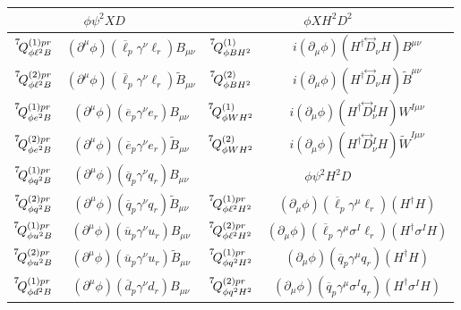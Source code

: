 \begin{table}[htbp]
\centering
\setlength{\tabcolsep}{1pt}
\renewcommand{\arraystretch}{1.5}
\begin{tabular}{ c|c||c|c }
\toprule
\multicolumn{2}{c||}{\cellcolor{hdrcolor}\hyperref[par:phipsi2XD]{\boldmath$\phi \psi^2 X D$}} & \multicolumn{2}{c}{\cellcolor{hdrcolor}\hyperref[par:phiXH2D2]{\boldmath$\phi X H^2 D^2$}} \\
\hline
$\op{7}{\phi \ell^2 B}{(1)pr}$ & $(\partial^\mu \phi)(\overline \ell_p \gamma^\nu \ell_r)B_{\mu\nu}$ & $\op{7}{\phi B H^2}{(1)}$ & $i(\partial_\mu \phi)(H^\dagger \overset{\leftrightarrow}{D}{}_\nu H)B^{\mu\nu}$
\\
$\op{7}{\phi \ell^2 B}{(2)pr}$ & $(\partial^\mu \phi)(\overline \ell_p \gamma^\nu \ell_r)\widetilde B_{\mu\nu}$  & $\op{7}{\phi B H^2}{(2)}$ & $i(\partial_\mu \phi)(H^\dagger \overset{\leftrightarrow}{D}{}_\nu H) \widetilde B^{\mu\nu}$
\\
$\op{7}{\phi e^2 B}{(1)pr}$ & $(\partial^\mu \phi)(\overline e_p \gamma^\nu e_r)B_{\mu\nu}$ & $\op{7}{\phi W H^2}{(1)}$ & $i(\partial_\mu \phi)(H^\dagger \overset{\leftrightarrow}{D}{}_\nu^I H)W^{I\mu\nu}$
\\
$\op{7}{\phi e^2 B}{(2)pr}$ & $(\partial^\mu \phi)(\overline e_p \gamma^\nu e_r)\widetilde B_{\mu\nu}$  & $\op{7}{\phi W H^2}{(2)}$ & $i(\partial_\mu \phi)(H^\dagger \overset{\leftrightarrow}{D}{}^I_\nu H) \widetilde W^{I\mu\nu}$
\\ \hhline{~|~||--}
$\op{7}{\phi q^2 B}{(1)pr}$ & $(\partial^\mu \phi)(\overline q_p \gamma^\nu q_r)B_{\mu\nu}$ & \multicolumn{2}{c}{\cellcolor{hdrcolor}\hyperref[par:phipsi2H2D]{\boldmath$\phi \psi^2 H^2 D$}} 
\\ \hhline{~|~||--}
$\op{7}{\phi q^2 B}{(2)pr}$ & $(\partial^\mu \phi)(\overline q_p \gamma^\nu q_r)\widetilde B_{\mu\nu}$   & $\op{7}{\phi \ell^2 H^2}{(1)pr}$ & $(\partial_\mu \phi)(\overline \ell_p \gamma^\mu \ell_r)(H^\dagger H)$ 
\\
$\op{7}{\phi u^2 B}{(1)pr}$ & $(\partial^\mu \phi)(\overline u_p \gamma^\nu u_r)B_{\mu\nu}$  & $\op{7}{\phi \ell^2 H^2}{(2)pr}$ & $(\partial_\mu \phi)(\overline \ell_p \gamma^\mu \sigma^I \ell_r)(H^\dagger \sigma^I H)$
\\
$\op{7}{\phi u^2 B}{(2)pr}$ & $(\partial^\mu \phi)(\overline u_p \gamma^\nu u_r)\widetilde B_{\mu\nu}$  & $\op{7}{\phi q^2 H^2}{(1)pr}$ & $(\partial_\mu \phi)(\overline q_p \gamma^\mu q_r)(H^\dagger H)$
\\
$\op{7}{\phi d^2 B}{(1)pr}$ & $(\partial^\mu \phi)(\overline d_p \gamma^\nu d_r)B_{\mu\nu}$ & $\op{7}{\phi q^2 H^2}{(2)pr}$ & $(\partial_\mu \phi)(\overline q_p \gamma^\mu \sigma^I q_r)(H^\dagger \sigma^I H)$

\end{tabular}
\end{table}

